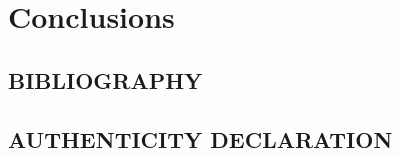 \chapter{Conclusions}
\thispagestyle{pagestyle}
\section{BIBLIOGRAPHY}

\section{AUTHENTICITY DECLARATION}
